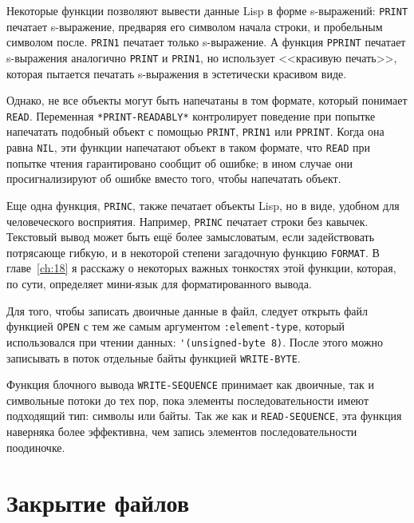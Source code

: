 Некоторые функции позволяют вывести данные Lisp в форме s-выражений: \lstinline{PRINT} печатает
s-выражение, предваряя его символом начала строки, и пробельным символом
после. \lstinline{PRIN1} печатает только s-выражение. А функция \lstinline{PPRINT} печатает
s-выражения аналогично \lstinline{PRINT} и \lstinline{PRIN1}, но использует <<красивую печать>>,
которая пытается печатать s-выражения в эстетически красивом виде.

Однако, не все объекты могут быть напечатаны в том формате, который понимает
\lstinline{READ}. Переменная \lstinline{*PRINT-READABLY*} контролирует поведение при попытке
напечатать подобный объект с помощью \lstinline{PRINT}, \lstinline{PRIN1} или \lstinline{PPRINT}. Когда
она равна \lstinline{NIL}, эти функции напечатают объект в таком формате, что \lstinline{READ} при
попытке чтения гарантировано сообщит об ошибке; в ином случае они просигнализируют об
ошибке вместо того, чтобы напечатать объект.

Еще одна функция, \lstinline{PRINC}, также печатает объекты Lisp, но в виде, удобном для
человеческого восприятия. Например, \lstinline{PRINC} печатает строки без кавычек. Текстовый
вывод может быть ещё более замысловатым, если задействовать потрясающе гибкую, и в
некоторой степени загадочную функцию \lstinline{FORMAT}. В главе~\ref{ch:18} я расскажу о
некоторых важных тонкостях этой функции, которая, по сути, определяет мини-язык для
форматированного вывода.

Для того, чтобы записать двоичные данные в файл, следует открыть файл функцией \lstinline{OPEN}
с тем же самым аргументом \lstinline{:element-type}, который использовался при чтении данных:
\lstinline{'(unsigned-byte 8)}. После этого можно записывать в поток отдельные байты функцией
\lstinline{WRITE-BYTE}.

Функция блочного вывода \lstinline{WRITE-SEQUENCE} принимает как двоичные, так и символьные
потоки до тех пор, пока элементы последовательности имеют подходящий тип: символы или
байты. Так же как и \lstinline{READ-SEQUENCE}, эта функция наверняка более эффективна, чем
запись элементов последовательности поодиночке.

\section{Закрытие файлов}

